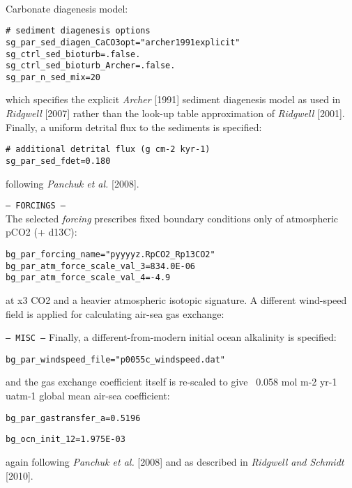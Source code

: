 \documentclass[10pt,twoside]{article}
\begin{document}
\begin{compactitem}
\\Carbonate diagenesis model:
\vspace{-5pt}\begin{verbatim}
# sediment diagenesis options
sg_par_sed_diagen_CaCO3opt="archer1991explicit"
sg_ctrl_sed_bioturb=.false.
sg_ctrl_sed_bioturb_Archer=.false.
sg_par_n_sed_mix=20
\end{verbatim}\vspace{-5pt}
which specifies the explicit \textit{Archer} [1991] sediment diagenesis model as used in \textit{Ridgwell} [2007] rather than the look-up table approximation of \textit{Ridgwell} [2001].
\\Finally, a uniform detrital flux to the sediments is specified:
\vspace{-5pt}\begin{verbatim}
# additional detrital flux (g cm-2 kyr-1)
sg_par_sed_fdet=0.180
\end{verbatim}\vspace{-5pt}
following \textit{Panchuk et al.} [2008].
                \item \texttt{--- FORCINGS ---}
        \\ The selected \textit{forcing} prescribes fixed boundary conditions only of atmospheric pCO2 (+ d13C):
\vspace{-5pt}\begin{verbatim}
bg_par_forcing_name="pyyyyz.RpCO2_Rp13CO2"
bg_par_atm_force_scale_val_3=834.0E-06
bg_par_atm_force_scale_val_4=-4.9
\end{verbatim}\vspace{-5pt}
at x3 CO2 and a heavier atmospheric isotopic signature.
A different wind-speed field is applied for calculating air-sea gas exchange:
                \item \texttt{--- MISC ---}
Finally, a different-from-modern initial ocean alkalinity is specified:
\vspace{-5pt}\begin{verbatim}
bg_par_windspeed_file="p0055c_windspeed.dat"
\end{verbatim}\vspace{-5pt}
and the gas exchange coefficient itself is re-scaled to give ~0.058 mol m-2 yr-1 uatm-1 global mean air-sea coefficient:
\vspace{-5pt}\begin{verbatim}
bg_par_gastransfer_a=0.5196
\end{verbatim}\vspace{-5pt}
\vspace{-5pt}\begin{verbatim}
bg_ocn_init_12=1.975E-03
                \end{verbatim}\vspace{-5pt}
again following \textit{Panchuk et al.} [2008] and as described in \textit{Ridgwell and Schmidt} [2010].
        \end{compactitem}
\end{document}
